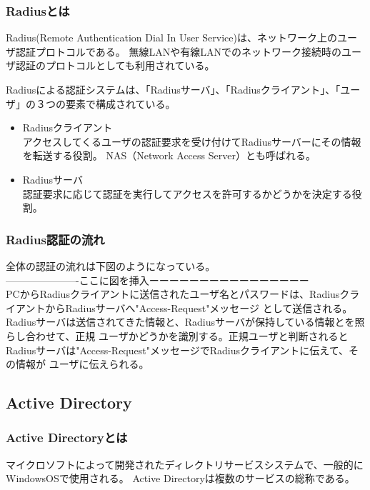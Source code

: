 \documentclass[12pt,a4paper,titlepage]{jsarticle}
\begin{document}
\subsubsection*{Radiusとは}
Radius(Remote Authentication Dial In User Service)は、ネットワーク上のユーザ認証プロトコルである。
無線LANや有線LANでのネットワーク接続時のユーザ認証のプロトコルとしても利用されている。


Radiusによる認証システムは、「Radiusサーバ」、「Radiusクライアント」、「ユーザ」の３つの要素で構成されている。

\begin{itemize}
    \item Radiusクライアント\mbox{}\\
    アクセスしてくるユーザの認証要求を受け付けてRadiusサーバーにその情報を転送する役割。
    NAS（Network Access Server）とも呼ばれる。
    \item Radiusサーバ\mbox{}\\
    認証要求に応じて認証を実行してアクセスを許可するかどうかを決定する役割。


\end{itemize}

\subsubsection*{Radius認証の流れ}
全体の認証の流れは下図のようになっている。\\
----------------------ここに図を挿入ーーーーーーーーーーーーーーーー\\

PCからRadiusクライアントに送信されたユーザ名とパスワードは、RadiusクライアントからRadiusサーバへ"Access-Request"メッセージ
として送信される。Radiusサーバは送信されてきた情報と、Radiusサーバが保持している情報とを照らし合わせて、正規
ユーザかどうかを識別する。正規ユーザと判断されるとRadiusサーバは"Access-Request"メッセージでRadiusクライアントに伝えて、その情報が
ユーザに伝えられる。




\subsection{Active Directory}
\subsubsection*{Active Directoryとは}
マイクロソフトによって開発されたディレクトリサービスシステムで、一般的にWindowsOSで使用される。
Active Directoryは複数のサービスの総称である。
\end{document}
